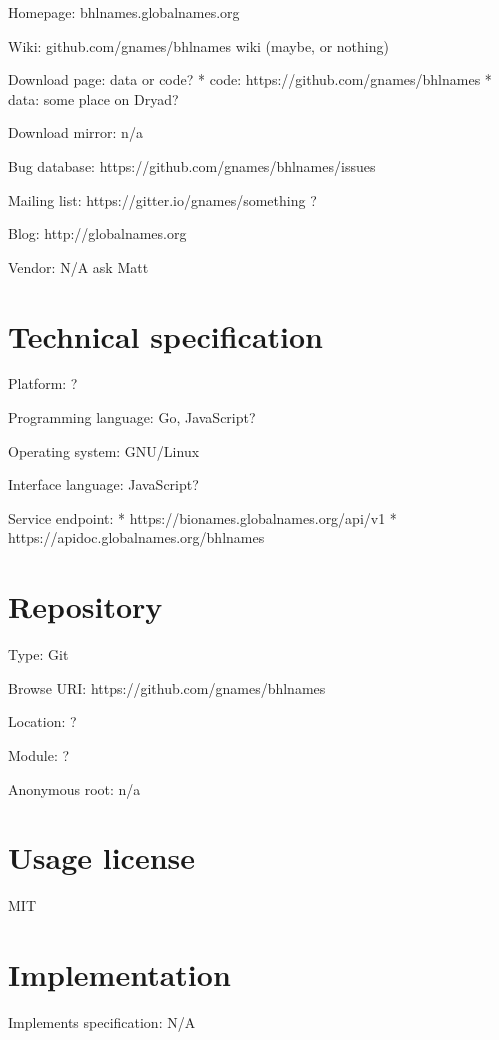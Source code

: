 \documentclass[
]{article}
\begin{document}
Homepage: bhlnames.globalnames.org

Wiki: github.com/gnames/bhlnames wiki (maybe, or nothing)

Download page: data or code? * code: https://github.com/gnames/bhlnames
* data: some place on Dryad?

Download mirror: n/a

Bug database: https://github.com/gnames/bhlnames/issues

Mailing list: https://gitter.io/gnames/something ?

Blog: http://globalnames.org

Vendor: N/A ask Matt

\hypertarget{technical-specification}{%
\section{Technical specification}\label{technical-specification}}

Platform: ?

Programming language: Go, JavaScript?

Operating system: GNU/Linux

Interface language: JavaScript?

Service endpoint: * https://bionames.globalnames.org/api/v1 *
https://apidoc.globalnames.org/bhlnames

\hypertarget{repository}{%
\section{Repository}\label{repository}}

Type: Git

Browse URI: https://github.com/gnames/bhlnames

Location: ?

Module: ?

Anonymous root: n/a

\hypertarget{usage-license}{%
\section{Usage license}\label{usage-license}}

MIT

\hypertarget{implementation}{%
\section{Implementation}\label{implementation}}

Implements specification: N/A
\end{document}
